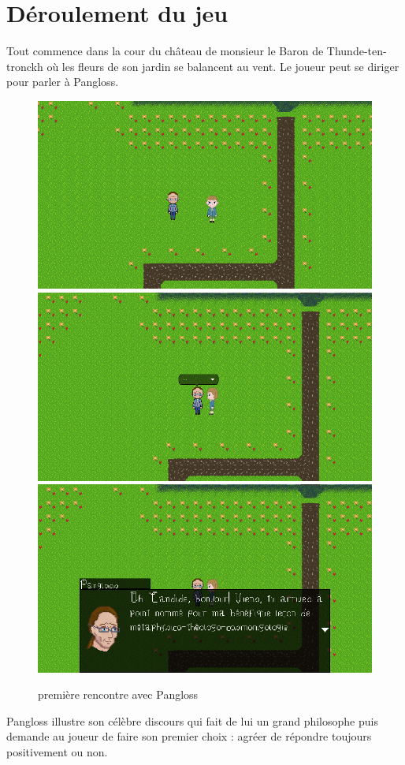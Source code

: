 \documentclass[11pt]{article}
\begin{document}
\section{Déroulement du jeu}
Tout commence dans la cour du château de monsieur le Baron de Thunde-ten-tronckh où les fleurs de son jardin se balancent au vent. Le joueur peut se diriger pour parler à Pangloss.
\begin{figure}[H]
\includegraphics[scale=0.35]{gameplay1}
\includegraphics[scale=0.35]{gameplay2}
\includegraphics[scale=0.35]{gameplay3}
\centering
\caption{première rencontre avec Pangloss}
\end{figure}
Pangloss illustre son célèbre discours qui fait de lui un grand philosophe puis demande au joueur de faire son premier choix : agréer de répondre toujours positivement ou non. \\
\end{document}
